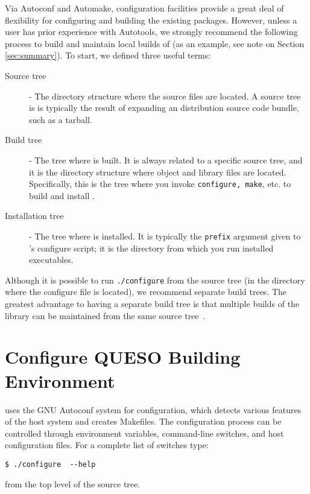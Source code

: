 Via Autoconf and Automake, \Queso{} configuration facilities provide a great deal 
of flexibility for configuring and building the existing \Queso{} packages. However,
unless a user has prior experience with Autotools, we strongly recommend
the following process to build and maintain local builds of \Queso{} (as an example, see note on Section \ref{sec:summary}).
To start, we defined three useful terms:

\begin{description}
 \item [Source tree] - The directory structure where the \Queso{} source files are located. A source
tree is is typically the result of expanding an \Queso{} distribution source code bundle, such as a tarball.%
 \item [Build tree] %
- The tree where \Queso{} is built. It is always related to a specific source tree, and it is the directory structure where object and library files are located. Specifically, this is the tree where you invoke \texttt{configure, make}, etc. to build and install \Queso{}. 
 \item [Installation tree] - The tree where \Queso{} is installed. It is typically the \texttt{prefix} argument given to \Queso{}'s configure script; it is the directory from which you run installed \Queso{} executables.
\end{description}

Although it is possible to run \verb+./configure+ from the source tree (in the directory where the configure file is located), we recommend separate build trees. The greatest advantage to having a separate build tree is that multiple builds of the library
can be maintained from the same source tree~\cite{Trilinos}. 


\section{Configure QUESO Building Environment}\label{sec:Queso_configure}

\Queso{} uses the GNU Autoconf system for configuration, which detects various features of the host system and creates Makefiles. 
The configuration process can be controlled through environment variables, command-line switches, and host configuration files.
For a complete list of switches type:
\begin{lstlisting}
$ ./configure  --help  
\end{lstlisting}
%
from the top level of the source tree. 

